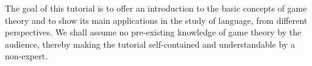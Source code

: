 \begin{tutorial}
The goal of this tutorial is to offer an introduction to the basic concepts of game theory and to show its main applications in the study of language, from different perspectives. We shall assume no pre-existing knowledge of game theory by the audience, thereby making the tutorial self-contained and understandable by a non-expert. 

\end{tutorial} 

